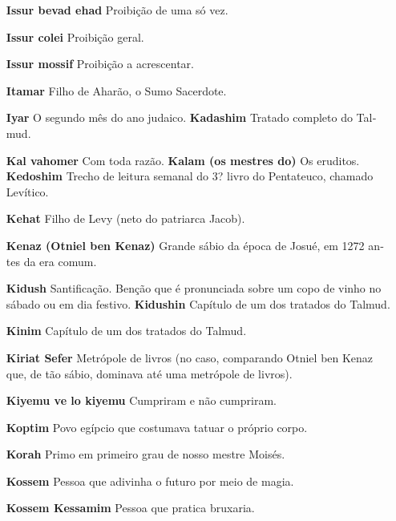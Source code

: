 \begin{itemize}
\item[\textbf{Issur bevad ehad}] Proibição de uma só vez.

\item[\textbf{Issur colei}] Proibição geral.

\item[\textbf{Issur mossif}] Proibição a acrescen­tar.

\item[\textbf{Itamar}] Filho de Aharão, o Sumo Sa­cerdote.

\item[\textbf{Iyar} O segundo mês do ano judaico. \textbf{Kadashim}]
Tratado completo do Tal­mud.

\item[\textbf{Kal vahomer} Com toda razão. \textbf{Kalam (os mestres do)}]
Os eruditos. \textbf{Kedoshim} Trecho de leitura sema­nal do 3? livro
do Pentateuco, chama­do Levítico.

\item[\textbf{Kehat}] Filho de Levy (neto do patriar­ca Jacob).

\item[\textbf{Kenaz (Otniel ben Kenaz)}] Grande sábio da época de Josué, em
1272 an­tes da era comum.

\item[\textbf{Kidush}] Santificação. Benção que é pronunciada sobre um copo
de vinho no sábado ou em dia festivo. \textbf{Kidushin} Capítulo de um
dos trata­dos do Talmud.

\item[\textbf{Kinim}] Capítulo de um dos tratados do Talmud.

\item[\textbf{Kiriat Sefer}] Metrópole de livros (no caso, comparando Otniel
ben Kenaz que, de tão sábio, dominava até uma metrópole de livros).

\item[\textbf{Kiyemu ve lo kiyemu}] Cumpriram e não cumpriram.

\item[\textbf{Koptim}] Povo egípcio que costuma­va tatuar o próprio corpo.

\item[\textbf{Korah}] Primo em primeiro grau de nosso mestre Moisés.

\item[\textbf{Kossem}] Pessoa que adivinha o futu­ro por meio de magia.

\item[\textbf{Kossem Kessamim}] Pessoa que pra­tica bruxaria.


\end{itemize}
